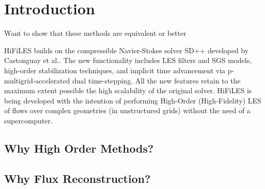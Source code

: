 \section{Introduction}

Want to show that these methods are equivalent or better 


HiFiLES builds on the compressible Navier-Stokes solver SD++ developed by Castonguay et al.\cite{castonguay2011}. The new functionality includes LES filters and SGS models, high-order stabilization techniques, and implicit time advancement via p-multigrid-accelerated dual time-stepping. All the new features retain to the maximum extent possible the high scalability of the original solver. HiFiLES is being developed with the intention of performing High-Order (High-Fidelity) LES of flows over complex geometries (in unstructured grids) without the need of a supercomputer. 

\subsection{Why High Order Methods?}

\subsection{Why Flux Reconstruction?}

